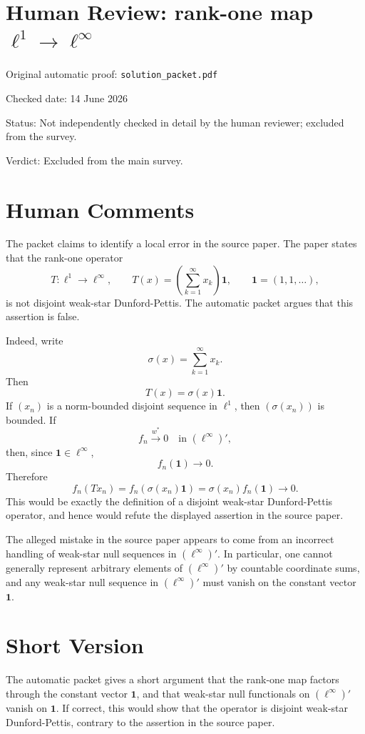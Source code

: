 \documentclass[11pt]{article}
\newcommand{\ellone}{\ell^1}
\newcommand{\ellinf}{\ell^\infty}
\newcommand{\one}{\mathbf 1}
\begin{document}
\section*{Human Review: rank-one map \(\ell^1\to\ell^\infty\)}

\noindent Original automatic proof: \texttt{solution\_packet.pdf}

\noindent Checked date: 14 June 2026

\noindent Status: Not independently checked in detail by the human reviewer;
excluded from the survey.

\noindent Verdict: Excluded from the main survey.

\section*{Human Comments}

The packet claims to identify a local error in the source paper.  The paper
states that the rank-one operator
\[
  T:\ellone\to\ellinf,
  \qquad
  T(x)=\left(\sum_{k=1}^\infty x_k\right)\one,
  \qquad
  \one=(1,1,\ldots),
\]
is not disjoint weak-star Dunford-Pettis.  The automatic packet argues that
this assertion is false.

Indeed, write
\[
  \sigma(x)=\sum_{k=1}^\infty x_k.
\]
Then
\[
  T(x)=\sigma(x)\one.
\]
If \((x_n)\) is a norm-bounded disjoint sequence in \(\ellone\), then
\((\sigma(x_n))\) is bounded.  If
\[
  f_n\overset{w^*}{\longrightarrow}0
  \quad\text{in }(\ellinf)',
\]
then, since \(\one\in\ellinf\),
\[
  f_n(\one)\longrightarrow 0.
\]
Therefore
\[
  f_n(Tx_n)
  =
  f_n(\sigma(x_n)\one)
  =
  \sigma(x_n)f_n(\one)
  \longrightarrow 0.
\]
This would be exactly the definition of a disjoint weak-star
Dunford-Pettis operator, and hence would refute the displayed assertion in
the source paper.

The alleged mistake in the source paper appears to come from an incorrect handling
of weak-star null sequences in \((\ell^\infty)'\).  In particular, one cannot
generally represent arbitrary elements of \((\ell^\infty)'\) by countable
coordinate sums, and any weak-star null sequence in \((\ell^\infty)'\) must
vanish on the constant vector \(\one\).

\section*{Short Version}

The automatic packet gives a short argument that the rank-one map factors
through the constant vector \(\one\), and that weak-star null functionals on
\((\ell^\infty)'\) vanish on \(\one\).  If correct, this would show that the
operator is disjoint weak-star Dunford-Pettis, contrary to the assertion in
the source paper.
\end{document}
